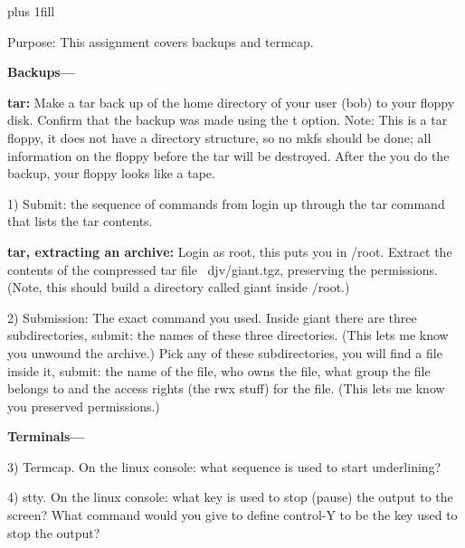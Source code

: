 
\rightskip=0pt plus 1fill

\parindent 0pt

Purpose: This assignment covers backups and termcap.

{\bf Backups---}

{\bf tar:}
Make a tar back up of the home directory of your user (bob) to your floppy
disk.
Confirm that the backup was made using the {\ltt{}t} option.
Note: This is a tar floppy, it does not have a directory structure,
so no mkfs should be done; all information on the floppy before
the tar will be destroyed. After the you do the backup, your
floppy looks like a tape.

1) Submit: the sequence of commands from login up through the
tar command that lists the tar contents.

{\bf tar, extracting an archive:}
Login as root, this puts you in {\ltt{}/root}.
Extract the contents of the compressed tar file {\ltt{}~djv/giant.tgz},
preserving the permissions.
(Note, this should build a directory called {\ltt{}giant} inside {\ltt{}/root}.)

2) Submission: The exact command you used.
Inside {\ltt{}giant} there are three subdirectories, submit: the names of
these three directories. (This lets me know you unwound the archive.)
Pick any of these subdirectories, you will find a file inside it,
submit: the name of the file, who owns the file, what group the file
belongs to and the access rights (the {\ltt{}rwx} stuff) for the file.
(This lets me know you preserved permissions.)

{\bf Terminals---}

3) Termcap.
On the linux console: what sequence is used to 
start underlining?

4) stty.
On the linux console: what key is used to stop (pause) the output to the
screen?
What command would you give to define control-Y to be the key used
to stop the output?

\bye
